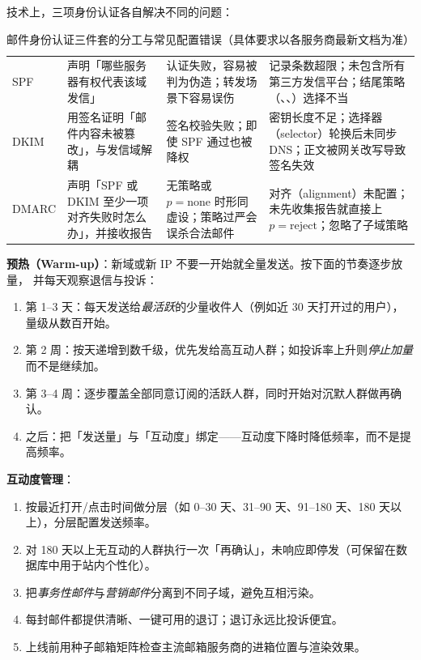技术上，三项身份认证各自解决不同的问题：

\begin{table}[htbp]
\centering
\caption{邮件身份认证三件套的分工与常见配置错误（具体要求以各服务商最新文档为准）}
\label{tab:email-auth}
\small
\begin{tabularx}{\textwidth}{L{1.55cm} L{3.2cm} L{3.3cm} Y}
\toprule
{} &  &  &  \\
\midrule
SPF & 声明「哪些服务器有权代表该域发信」 & 认证失败，容易被判为伪造；转发场景下容易误伤 & 记录条数超限；未包含所有第三方发信平台；结尾策略（、、）选择不当 \\
\addlinespace
DKIM & 用签名证明「邮件内容未被篡改」，与发信域解耦 & 签名校验失败；即使 SPF 通过也被降权 & 密钥长度不足；选择器（selector）轮换后未同步 DNS；正文被网关改写导致签名失效 \\
\addlinespace
DMARC & 声明「SPF 或 DKIM 至少一项对齐失败时怎么办」，并接收报告 & 无策略或 $p=\text{none}$ 时形同虚设；策略过严会误杀合法邮件 & 对齐（alignment）未配置；未先收集报告就直接上 $p=\text{reject}$；忽略了子域策略 \\
\bottomrule
\end{tabularx}
\end{table}

\begin{toolbox}[新发件域预热与互动度管理清单]
\textbf{预热（Warm-up）}：新域或新 IP 不要一开始就全量发送。按下面的节奏逐步放量，
并每天观察退信与投诉：
\begin{enumerate}
  \item 第 1--3 天：每天发送给\emph{最活跃}的少量收件人（例如近 30 天打开过的用户），量级从数百开始。
  \item 第 2 周：按天递增到数千级，优先发给高互动人群；如投诉率上升则\emph{停止加量}而不是继续加。
  \item 第 3--4 周：逐步覆盖全部同意订阅的活跃人群，同时开始对沉默人群做再确认。
  \item 之后：把「发送量」与「互动度」绑定——互动度下降时降低频率，而不是提高频率。
\end{enumerate}
\textbf{互动度管理}：
\begin{enumerate}
  \item 按最近打开/点击时间做分层（如 0--30 天、31--90 天、91--180 天、180 天以上），分层配置发送频率。
  \item 对 180 天以上无互动的人群执行一次「再确认」，未响应即停发（可保留在数据库中用于站内个性化）。
  \item 把\emph{事务性邮件}与\emph{营销邮件}分离到不同子域，避免互相污染。
  \item 每封邮件都提供清晰、一键可用的退订；退订永远比投诉便宜。
  \item 上线前用种子邮箱矩阵检查主流邮箱服务商的进箱位置与渲染效果。
\end{enumerate}
\end{toolbox}

